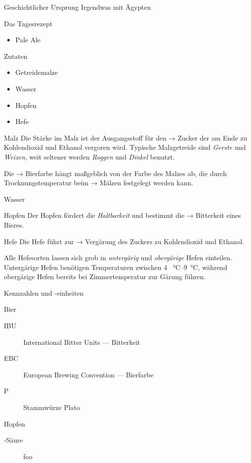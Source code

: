 \documentclass[9pt, ngerman]{beamer}
\begin{document}
\begin{frame}{Geschichtlicher Ursprung}
  Irgendwas mit Ägypten
\end{frame}
\begin{frame}{Das Tagesrezept}
  \begin{itemize}
    \item Pale Ale
  \end{itemize}
\end{frame}
\begin{frame}{Zutaten}
  \begin{itemize}
    \item Getreidemalze
    \item Wasser
    \item Hopfen
    \item Hefe
  \end{itemize}
\end{frame}
\begin{frame}{Malz}
  Die Stärke im Malz ist der Ausgangsstoff für den → Zucker der am Ende zu Kohlendioxid und
  Ethanol vergoren wird. Typische Malzgetreide sind \emph{Gerste} und \emph{Weizen},
  weit seltener werden \emph{Roggen} und \emph{Dinkel} benutzt.

  Die → Bierfarbe hängt maßgeblich von der Farbe des Malzes ab, die durch
  Trocknungstemperatur beim → Mälzen festgelegt werden kann.
\end{frame}
\begin{frame}{Wasser}
\end{frame}
\begin{frame}{Hopfen}
  Der Hopfen fördert die \emph{Haltbarkeit} und bestimmt die → Bitterkeit eines
  Bieres.
\end{frame}
\begin{frame}{Hefe}
  Die Hefe führt zur → Vergärung des Zuckers zu Kohlendioxid und Ethanol.

  Alle Hefesorten lassen sich grob in \emph{untergärig} und \emph{obergärige}
  Hefen einteilen.  Untergärige Hefen benötigen Temperaturen zwischen \SIrange{4
  }{9}{\celsius}, während obergärige Hefen bereits bei Zimmertemperatur zur
  Gärung führen.
\end{frame}
\begin{frame}{Kennzahlen und -einheiten}
  \begin{block}{Bier}
    \begin{description}
      \item[IBU] International Bitter Units --- Bitterkeit
      \item[EBC] European Brewing Convention --- Bierfarbe
      \item[\textdegree P] Stammwürze \textdegree Plato
    \end{description}
  \end{block}

  \begin{block}{Hopfen}
    \begin{description}
      \item[\textalpha-Säure]  foo
    \end{description}
  \end{block}
\end{frame}
\end{document}
